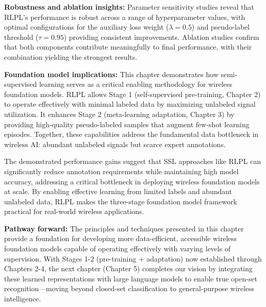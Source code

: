 \textbf{Robustness and ablation insights:} Parameter sensitivity studies reveal that RLPL's performance is robust across a range of hyperparameter values, with optimal configurations for the auxiliary loss weight ($\lambda=0.5$) and pseudo-label threshold ($\tau=0.95$) providing consistent improvements. Ablation studies confirm that both components contribute meaningfully to final performance, with their combination yielding the strongest results.

\textbf{Foundation model implications:} This chapter demonstrates how semi-supervised learning serves as a critical enabling methodology for wireless foundation models. RLPL allows Stage 1 (self-supervised pre-training, Chapter 2) to operate effectively with minimal labeled data by maximizing unlabeled signal utilization. It enhances Stage 2 (meta-learning adaptation, Chapter 3) by providing high-quality pseudo-labeled samples that augment few-shot learning episodes. Together, these capabilities address the fundamental data bottleneck in wireless AI: abundant unlabeled signals but scarce expert annotations.

The demonstrated performance gains suggest that SSL approaches like RLPL can significantly reduce annotation requirements while maintaining high model accuracy, addressing a critical bottleneck in deploying wireless foundation models at scale. By enabling effective learning from limited labels and abundant unlabeled data, RLPL makes the three-stage foundation model framework practical for real-world wireless applications.

\textbf{Pathway forward:} The principles and techniques presented in this chapter provide a foundation for developing more data-efficient, accessible wireless foundation models capable of operating effectively with varying levels of supervision. With Stages 1-2 (pre-training + adaptation) now established through Chapters 2-4, the next chapter (Chapter 5) completes our vision by integrating these learned representations with large language models to enable true open-set recognition—moving beyond closed-set classification to general-purpose wireless intelligence.

